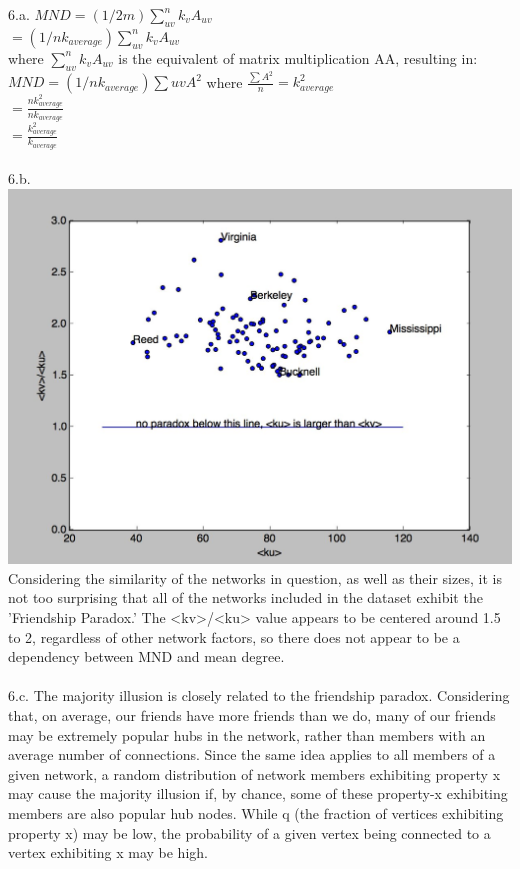 \documentclass[11pt, oneside]{article}   	%
\begin{document}
\justify
6.a.  $MND = (1/2m)\sum_{uv}^{n} k_vA_{uv}$\\
\indent $= (1 /nk_{average} )\sum_{uv}^{n}k_vA_{uv}$\\
\indent where $\sum_{uv}^{n}k_vA_{uv}$ is the equivalent of matrix multiplication AA, resulting in:\\
\indent $MND = (1/nk_{average})\sum{uv}A^2$ where $\frac{\sum A^{2}}{n} = k_{average}^2$\\
\indent $=\frac{n k_{average}^{2}}{nk_{average}}$\\
\indent $=\frac{k_{average}^2}{k_{average}}$\\
\\
\vskip2in
6.b.\\
\includegraphics[scale=.5]{FB100}\\
Considering the similarity of the networks in question, as well as their sizes, it is not too surprising that all of the networks included in the dataset exhibit the 'Friendship Paradox.'  The <kv>/<ku> value appears to be centered around 1.5 to 2, regardless of other network factors, so there does not appear to be a dependency between MND and mean degree.\\
\\
6.c. The majority illusion is closely related to the friendship paradox.  Considering that, on average, our friends have more friends than we do, many of our friends may be extremely popular hubs in the network, rather than members with an average number of connections.  Since the same idea applies to all members of a given network, a random distribution of network members exhibiting property x may cause the majority illusion if, by chance, some of these property-x exhibiting members are also popular hub nodes.  While q (the fraction of vertices exhibiting property x) may be low, the probability of a given vertex being connected to a vertex exhibiting x may be high.\\
\\
\\
\\
\\
\\
\\
\\
\\
\\
\end{document}
